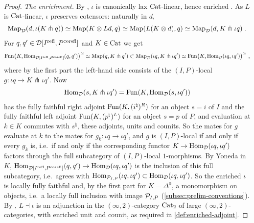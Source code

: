 \begin{proof}
\emph{The enrichment.}
By \cite[7.3.2.7]{ha}, $\iota$ is canonically lax $\mathrm{Cat}$-linear,
hence enriched \cite{heine2023enriched}.
As $L$ is $\mathrm{Cat}$-linear, $\iota$ preserves cotensors: naturally in $d$,
\begin{equation*}
\mapp_{\D}(d,\iota(K \pitchfork q)) \simeq \mapp(K \otimes Ld,q) \simeq
\mapp(L(K \otimes d),q) \simeq \mapp_{\D}(d,K \pitchfork \iota q) \ .
\end{equation*}
For
$q,q' \in \mathcal{D}[{I}^{\mathrm{refl}},{P}^{\mathrm{corefl}}]$
and $K \in \mathrm{Cat}$ we get
\begin{equation*}
\operatorname{Fun}\bigl(K,\operatorname{Hom}_{\mathcal{D}[{I}^{\mathrm{refl}},{P}^{\mathrm{corefl}}]}(q,q')\bigr)^{\simeq} \simeq \operatorname{Map}(q,K
\pitchfork q') \subset \operatorname{Map}_{\mathcal{D}}(\iota q,K \pitchfork \iota q') \simeq
\operatorname{Fun}\bigl(K,\operatorname{Hom}_{\mathcal{D}}(\iota q,\iota q')\bigr)^{\simeq} \ ,
\end{equation*}
where by the first part the left-hand side consists of the $(I,P)$-local
$g\colon \iota q \to K \pitchfork \iota q'$.
Now
\begin{equation*}
\operatorname{Hom}_{\mathcal{D}}(s,K \pitchfork \iota q') = \operatorname{Fun}(K,\operatorname{Hom}_{\mathcal{D}}(s,\iota q'))
\end{equation*}
has the fully faithful right adjoint
$\operatorname{Fun}(K,(i^{\natural})^{R})$
for an object $s = i$ of $I$ and the fully faithful left adjoint
$\operatorname{Fun}(K,(p^{\natural})^{L})$
for an object $s = p$ of $P$, and evaluation at $k \in K$ commutes with
$s^{\natural}$, these adjoints, units and counits.
So the mates for $g$ evaluate at $k$ to the mates for
$g_{k}\colon \iota q \to \iota q'$,
and $g$ is $(I,P)$-local if and only if every $g_{k}$ is,
i.e.\ if and only if the corresponding functor
$K \to \operatorname{Hom}_{\mathcal{D}}(\iota q,\iota q')$
factors through the full subcategory of $(I,P)$-local $1$-morphisms.
By Yoneda in $K$,
$\operatorname{Hom}_{\mathcal{D}[{I}^{\mathrm{refl}},{P}^{\mathrm{corefl}}]}(q,q') \to \operatorname{Hom}_{\mathcal{D}}(\iota q,\iota q')$
is the inclusion of this full subcategory, i.e.\ agrees with
$\operatorname{Hom}_{\mathcal{P}_{I,P}}(\iota q,\iota q') \subset \operatorname{Hom}_{\mathcal{D}}(\iota q,\iota q')$.
So the enriched $\iota$ is locally fully faithful and,
by the first part for $K = \Delta^{0}$, a monomorphism on objects,
i.e.\ a locally full inclusion with image $\mathcal{P}_{I,P}$
(\cref{subsec:prelim-conventions}). By \cite{heine2023enriched},
$L \dashv \iota$ is an adjunction in the $(\infty,2)$-category $\mathrm{Cat}_{2}$ of
large $(\infty,2)$-categories, with enriched unit and counit,
as required in \cref{def:enriched-adjoint}.


\end{proof}
